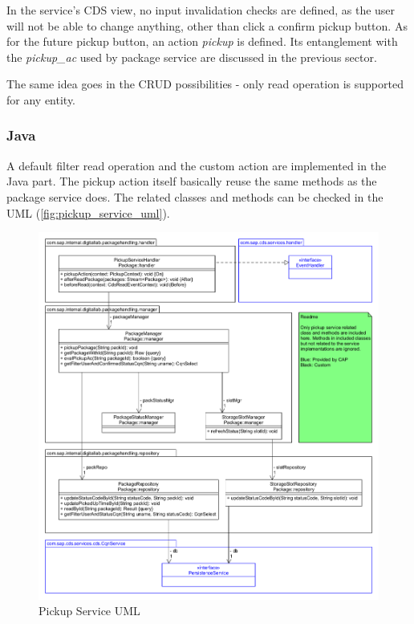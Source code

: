 \bigskip
In the service's CDS view, no input invalidation checks are defined, as the user will not be able to change anything, other than click a confirm pickup button. As for the future pickup button, an action \textit{pickup} is defined. Its entanglement with the \textit{pickup\_ac} used by package service are discussed in the previous sector.

\bigskip
The same idea goes in the CRUD possibilities - only read operation is supported for any entity.

\subsubsection{Java}

A default filter read operation and the custom action are implemented in the Java part. The pickup action itself basically reuse the same methods as the package service does. The related classes and methods can be checked in the UML (\autoref{fig:pickup_service_uml}). 

\begin{figure}[H]
    \centering
    \includegraphics[width=1\linewidth]{images/service_class_diagrams/pickup_service_class_diagram.png}
    \caption{Pickup Service UML}
    \label{fig:pickup_service_uml}
\end{figure}
\pagebreak

